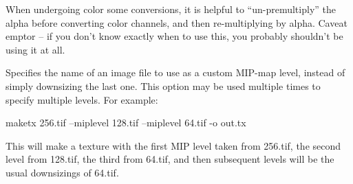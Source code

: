 When undergoing color some conversions, it is helpful to
``un-premultiply'' the alpha before converting color channels, and then
re-multiplying by alpha.  Caveat emptor -- if you don't know exactly
when to use this, you probably shouldn't be using it at all.
\apiend


Specifies the name of an image file to use as a custom MIP-map level, 
instead of simply downsizing the last one.  This option may be used
multiple times to specify multiple levels.  For example:
\begin{code}
    maketx 256.tif --miplevel 128.tif --miplevel 64.tif -o out.tx
\end{code}
This will make a texture with the first MIP level taken from {\cf 256.tif},
the second level from {\cf 128.tif}, the third from {\cf 64.tif}, and
then subsequent levels will be the usual downsizings of {\cf 64.tif}.
\apiend



\begin{comment}

\section{{\cf maketx} Recipes}


This section will give quick examples of common uses of {\cf maketx}.

\subsection*{Converting between file formats}

It's a snap to converting among image formats supported by \product
(i.e., for which \ImageInput and \ImageOutput plugins can be found).
The {\cf maketx} utility will simply infer the file format from the
file extension. The following example converts a PNG image to JPEG:

\begin{code}
    maketx lena.png lena.jpg
\end{code}

\end{comment}
